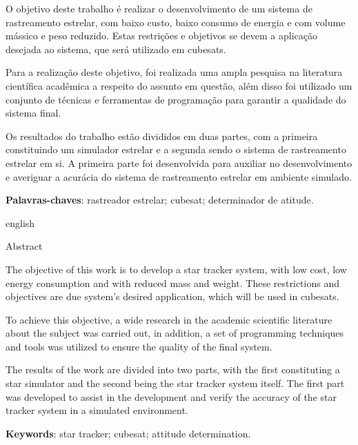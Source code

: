 \begin{resumo}
    
    O objetivo deste trabalho é realizar o desenvolvimento de um sistema de rastreamento estrelar, com baixo custo, baixo consumo de energia e com volume mássico e peso reduzido.
    Estas restrições e objetivos  se devem a aplicação desejada ao sistema, que será utilizado em cubesats.

    Para a realização deste objetivo, foi realizada uma ampla pesquisa na literatura científica acadêmica a respeito do assunto em questão, além disso foi utilizado um conjunto de técnicas e ferramentas de programação para garantir a qualidade do sistema final.
    
    Os resultados do trabalho estão divididos em duas partes, com a primeira constituindo um simulador estrelar e a segunda sendo o sistema de rastreamento estrelar em si. A primeira parte foi desenvolvida para auxiliar no desenvolvimento e averiguar a acurácia do sistema de rastreamento estrelar em ambiente simulado.
    
    \vspace{\onelineskip}

    \noindent\textbf{Palavras-chaves}: rastreador estrelar; cubesat; determinador de atitude.

    \vspace{\onelineskip}
    \vspace{\onelineskip}

    \begin{otherlanguage*}{english}
    \begin{center}{\ABNTEXchapterfont\huge Abstract}\end{center}

    The objective of this work is to develop a star tracker system, with low cost, 
    low energy consumption and with reduced mass and weight.
    These restrictions and objectives are due system's desired application, which will be used in cubesats.
    
    To achieve this objective, a wide research in the academic scientific literature about the subject was carried out, 
    in addition, a set of programming techniques and tools was utilized to ensure the quality of the final system.
    
    The results of the work are divided into two parts, with the first constituting a star simulator and the second being the star tracker system itself. 
    The first part was developed to assist in the development and verify the accuracy of the star tracker system in a simulated environment.

    \vspace{\onelineskip}

    \noindent\textbf{Keywords}: star tracker; cubesat; attitude determination. 

    \end{otherlanguage*}
\end{resumo}



